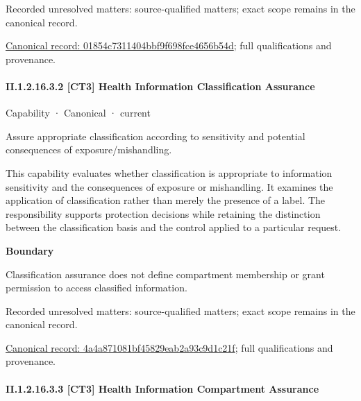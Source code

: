 {\small Recorded unresolved matters: source-qualified matters; exact scope remains in the canonical record.}\par
{\footnotesize \href{../../../../../../../continuum/strategy/capability/01854c7311404bbf9f698fce4656b54d.md}{Canonical record: 01854c7311404bbf9f698fce4656b54d}; full qualifications and provenance.}\par
\paragraph*{II.1.2.16.3.2 [CT3] Health Information Classification Assurance}
\label{navigation:II.1.2.16.3.2}

\label{element:4a4a871081bf45829eab2a93c9d1c21f}
{\small Capability · Canonical · current}\par

Assure appropriate classification according to sensitivity and potential consequences of exposure/mishandling.



This capability evaluates whether classification is appropriate to information sensitivity and the consequences of exposure or mishandling. It examines the application of classification rather than merely the presence of a label. The responsibility supports protection decisions while retaining the distinction between the classification basis and the control applied to a particular request.



\textbf{Boundary}



Classification assurance does not define compartment membership or grant permission to access classified information.


{\small Recorded unresolved matters: source-qualified matters; exact scope remains in the canonical record.}\par
{\footnotesize \href{../../../../../../../continuum/strategy/capability/4a4a871081bf45829eab2a93c9d1c21f.md}{Canonical record: 4a4a871081bf45829eab2a93c9d1c21f}; full qualifications and provenance.}\par
\paragraph*{II.1.2.16.3.3 [CT3] Health Information Compartment Assurance}
\label{navigation:II.1.2.16.3.3}

